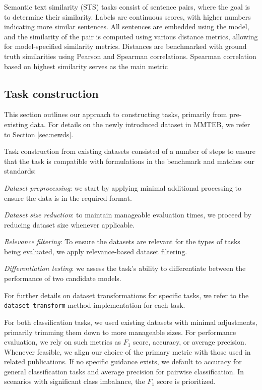\noindent
{} 
Semantic text similarity (STS) tasks consist of sentence pairs, where the goal is to determine their similarity. Labels are continuous scores, with higher numbers indicating more similar sentences. All sentences are embedded using the model, and the similarity of the pair is computed using various distance metrics, allowing for model-specified similarity metrics. Distances are benchmarked with ground truth similarities using Pearson and Spearman correlations. Spearman correlation based on highest similarity serves as the main metric \citep{reimers-etal-2016-task}


\subsection{Task construction}
\label{sec:task-construction}

This section outlines our approach to constructing tasks, primarily from pre-existing data.
For details on the newly introduced dataset in MMTEB, we refer to Section \ref{sec:newds}.

Task construction from existing datasets consisted of a number of steps to ensure that the task is compatible with formulations in the benchmark and matches our standards:
\begin{enumerate*}
    \item \textit{Dataset preprocessing}: we start by applying minimal additional processing to ensure the data is in the required format.
    \item \textit{Dataset size reduction}: to maintain manageable evaluation times, we proceed by reducing dataset size whenever applicable.
    \item \textit{Relevance filtering}: To ensure the datasets are relevant for the types of tasks being evaluated, we apply relevance-based dataset filtering.
    \item \textit{Differentiation testing}: we assess the task's ability to differentiate between the performance of two candidate models.
\end{enumerate*}


For further details on dataset transformations for specific tasks, we refer to the \texttt{dataset\_transform} method implementation for each task.


For both classification tasks, we used existing datasets with minimal adjustments, primarily trimming them down to more manageable sizes. For performance evaluation, we rely on such metrics as $F_1$ score, accuracy, or average precision. Whenever feasible, we align our choice of the primary metric with those used in related publications. If no specific guidance exists, we default to accuracy for general classification tasks and average precision for pairwise classification. In scenarios with significant class imbalance, the $F_1$ score is prioritized.

